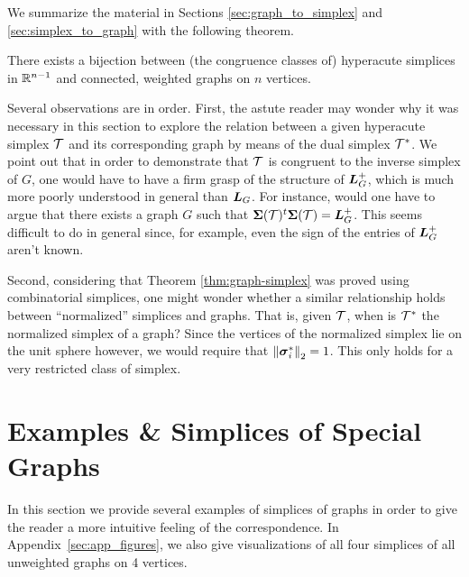 We summarize the material in Sections \ref{sec:graph_to_simplex} and \ref{sec:simplex_to_graph} with the following theorem. 

\begin{theorem}
	\label{thm:graph-simplex}
	There exists a bijection between (the congruence classes of) hyperacute  simplices in $\mathbb{R}^{n-1}$ and connected, weighted graphs on $n$ vertices. 
\end{theorem}

Several observations are in order. 
First, the astute reader may wonder why it was necessary in this section to explore the relation between a given hyperacute simplex $\mathcal{T}$ and its corresponding graph by means of the dual simplex $\mathcal{T}^*$. We point out that in order to demonstrate that $\mathcal{T}$ is congruent to the inverse simplex of $G$, one would have to have a firm grasp of the structure of $\vb*{L}_G^+$, which is much more poorly understood in general than $\vb*{L}_G$. For instance, would one have to argue that there exists a graph $G$ such that $\boldsymbol{\Sigma}(\mathcal{T})^t \boldsymbol{\Sigma}(\mathcal{T}) = \vb*{L}_G^+$. This seems difficult to do in general since, for example, even the sign of the entries of $\vb*{L}_G^+$ aren't known. 

Second, considering that Theorem \ref{thm:graph-simplex} was proved using combinatorial simplices, one might wonder whether a similar relationship holds between ``normalized'' simplices and graphs. That is, given $\mathcal{T}$, when is $\mathcal{T}^*$ the normalized simplex of a graph? Since the vertices of the normalized simplex lie on the unit sphere however, we would require that $\norm{\vb*{\sigma}_i^*}_2=1$. This only holds for a very restricted class of simplex. 



\section{Examples \& Simplices of Special Graphs}
\label{sec:special_graphs}
In this section we provide several examples of simplices of graphs in order to give the reader a more intuitive feeling of the correspondence. In Appendix~\ref{sec:app_figures}, we also give visualizations of all four simplices of all unweighted graphs on 4 vertices. 

